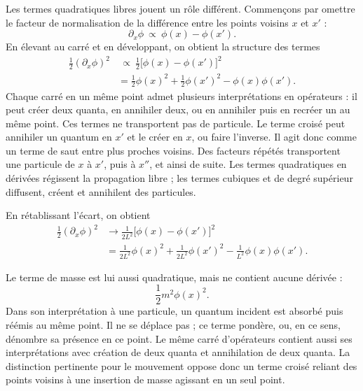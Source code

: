 Les termes quadratiques libres jouent un rôle différent. Commençons par omettre le facteur de normalisation de la différence entre les points voisins \(x\) et \(x'\) :
\begin{equation}
\partial_x\phi
\ \propto\
\phi(x)-\phi(x').
\end{equation}
En élevant au carré et en développant, on obtient la structure des termes
\begin{align}
\frac12(\partial_x\phi)^2
&\ \propto\
\frac12\bigl[\phi(x)-\phi(x')\bigr]^2
\\
&=
\frac12\phi(x)^2
+\frac12\phi(x')^2
-\phi(x)\phi(x').
\end{align}
Chaque carré en un même point admet plusieurs interprétations en opérateurs : il peut créer deux quanta, en annihiler deux, ou en annihiler puis en recréer un au même point. Ces termes ne transportent pas de particule. Le terme croisé peut annihiler un quantum en \(x'\) et le créer en \(x\), ou faire l’inverse. Il agit donc comme un terme de saut entre plus proches voisins. Des facteurs répétés transportent une particule de \(x\) à \(x'\), puis à \(x''\), et ainsi de suite. Les termes quadratiques en dérivées régissent la propagation libre ; les termes cubiques et de degré supérieur diffusent, créent et annihilent des particules.

\begin{classroomqa}
\end{classroomqa}

En rétablissant l’écart, on obtient
\begin{align}
\frac12(\partial_x\phi)^2
&\longrightarrow
\frac{1}{2L^2}\bigl[\phi(x)-\phi(x')\bigr]^2
\\
&=
\frac{1}{2L^2}\phi(x)^2
+\frac{1}{2L^2}\phi(x')^2
-\frac{1}{L^2}\phi(x)\phi(x').
\end{align}

Le terme de masse est lui aussi quadratique, mais ne contient aucune dérivée :
\begin{equation}
\frac12m^2\phi(x)^2.
\end{equation}
Dans son interprétation à une particule, un quantum incident est absorbé puis réémis au même point. Il ne se déplace pas ; ce terme pondère, ou, en ce sens, dénombre sa présence en ce point. Le même carré d’opérateurs contient aussi ses interprétations avec création de deux quanta et annihilation de deux quanta. La distinction pertinente pour le mouvement oppose donc un terme croisé reliant des points voisins à une insertion de masse agissant en un seul point.

